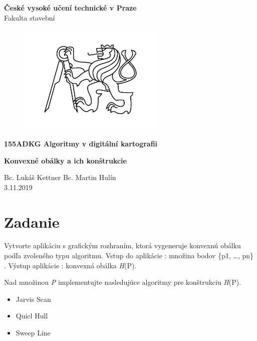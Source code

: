 \documentclass[12pt]{article}
\begin{document}
\begin{titlepage}
\centering
\Large \textbf{České vysoké učení technické v Praze }\\ Fakulta stavební
\vspace{2cm}

\begin{figure}[h!] %
\centering
\includegraphics[width=7cm]{./img/cvut.png}
\end{figure}
 
\Large \textbf{155ADKG Algoritmy v digitální kartografii}
\vspace{1cm}

\LARGE  \textbf{ Konvexné obálky a ich konštrukcie}
\vspace{3cm}

\Large Bc. Lukáš Kettner Bc. Martin Hulín \\ 3.11.2019

 \thispagestyle{empty} %
\end{titlepage}

\tableofcontents    %
\newpage %
\section{Zadanie}
Vytvorte aplikáciu s grafickým rozhraním, ktorá vygeneruje konvexnú obálku podľa zvoleného typu algoritmu. Vstup do aplikácie : množina bodov  \{p1, …, pn\} . Výstup aplikácie : konvexná obálka  \textit{H}(P).

Nad množinou   \textit{P} implementujte nasledujúce algoritmy pre konštrukciu \textit{H}(P).

\begin{itemize}
\item Jarvis Scan
\item Quicl Hull
\item Sweep Line
\end{itemize}
		
\end{document}
